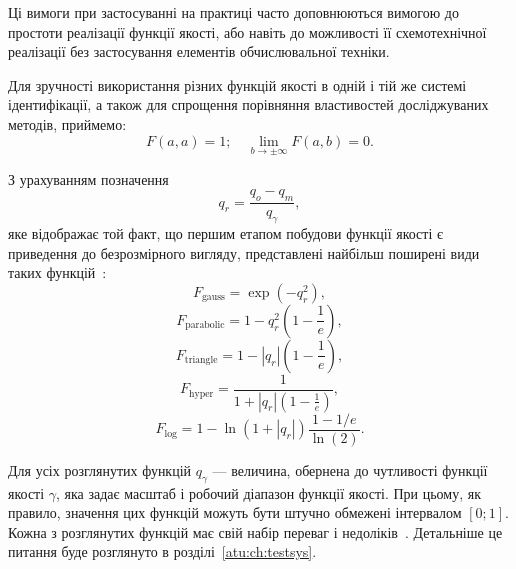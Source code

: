 Ці вимоги при застосуванні на практиці часто доповнюються
вимогою до простоти реалізації функції якості, або навіть до
можливості її схемотехнічної реалізації без застосування
елементів обчислювальної техніки.

Для зручності використання різних функцій якості в одній і
тій же системі ідентифікації, а також для спрощення порівняння
властивостей досліджуваних методів, приймемо:
%
\begin{equation}
  F(a,a) = 1;
  \quad
  \lim\limits_{b \to \pm \infty } F(a,b) = 0.
  \label{atu:eq:F_scale}
\end{equation}




З урахуванням позначення
\begin{equation}
  q_r = \frac{q_o - q_m}{q_\gamma},
\label{atu:eq:q_r}
\end{equation}
%
\noindent
яке відображає той факт, що першим етапом побудови функції якості
є приведення до безрозмірного вигляду, представлені найбільш
поширені види таких функцій~\cite{atu_ISDMCI2016,atu_asau24}:
%
\begin{equation}
  F_{\mathrm{gauss}} = \exp( - q_r^2 ),
\label{atu:eq:F_gauss}
\end{equation}
%
\begin{equation}
  F_{\mathrm{parabolic}} = 1 - q_r^2 \left( 1 - \frac{1}{e} \right),
\label{atu:eq:F_parabolic}
\end{equation}
%
\begin{equation}
  F_{\mathrm{triangle}} = 1 - |q_r| \left( 1 - \frac{1}{e} \right),
\label{atu:eq:F_triangle}
\end{equation}
%
\begin{equation}
  F_{\mathrm{hyper}} = \frac{1}{ 1 + |q_r| \left( 1 - \frac{1}{e} \right)},
\label{atu:eq:F_hyper}
\end{equation}
%
\begin{equation}
  F_{\mathrm{log}} = 1 - \ln \left( 1 + |q_r| \right) \frac{1-1/e}{\ln(2)}.
\label{atu:eq:F_log}
\end{equation}

Для усіх розглянутих функцій $q_\gamma$\label{atu:d:q_gamma}
--- величина, обернена до чутливості функції якості $\gamma$\label{atu:d:gamma},
яка задає масштаб і робочий діапазон функції якості.
При цьому, як правило, значення цих функцій можуть бути штучно
обмежені інтервалом
$ [0; 1] $. Кожна з розглянутих функцій має свій набір переваг і
недоліків~\cite{atu_ISDMCI2016}. Детальніше це питання буде розглянуто
в розділі~\ref{atu:ch:testsys}.

